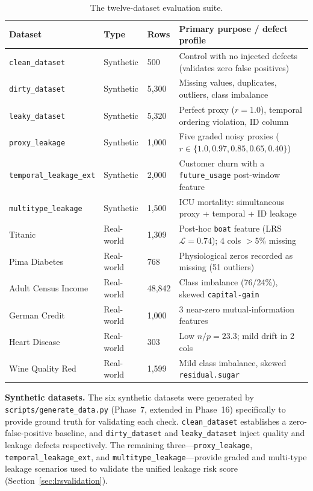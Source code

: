 \documentclass[12pt,a4paper]{report}
\newcommand{\tblhead}{\rowcolor{tblHeadBg}\color{white}\bfseries}
\begin{document}
\begin{table}[!ht]
\centering
\caption{The twelve-dataset evaluation suite.}
\label{tab:datasets}
\scriptsize
{}
\begin{tabularx}{\textwidth}{lllX}
\toprule
\tblhead \textbf{Dataset} & \textbf{Type} & \textbf{Rows} & \textbf{Primary purpose / defect profile} \\
\midrule
\texttt{clean\_dataset} & Synthetic & 500 & Control with no injected defects (validates zero false positives) \\
\texttt{dirty\_dataset} & Synthetic & 5,300 & Missing values, duplicates, outliers, class imbalance \\
\texttt{leaky\_dataset} & Synthetic & 5,320 & Perfect proxy ($r{=}1.0$), temporal ordering violation, ID column \\
\texttt{proxy\_leakage} & Synthetic & 1,000 & Five graded noisy proxies ($r\in\{1.0,0.97,0.85,0.65,0.40\}$) \\
\texttt{temporal\_leakage\_ext} & Synthetic & 2,000 & Customer churn with a \texttt{future\_usage} post-window feature \\
\texttt{multitype\_leakage} & Synthetic & 1,500 & ICU mortality: simultaneous proxy + temporal + ID leakage \\
\midrule
Titanic & Real-world & 1,309 & Post-hoc \texttt{boat} feature (LRS $\mathcal{L}{=}0.74$); 4 cols $>$5\% missing \\
Pima Diabetes & Real-world & 768 & Physiological zeros recorded as missing (51 outliers) \\
Adult Census Income & Real-world & 48,842 & Class imbalance (76/24\%), skewed \texttt{capital-gain} \\
German Credit & Real-world & 1,000 & 3 near-zero mutual-information features \\
Heart Disease & Real-world & 303 & Low $n/p{=}23.3$; mild drift in 2 cols \\
Wine Quality Red & Real-world & 1,599 & Mild class imbalance, skewed \texttt{residual.sugar} \\
\bottomrule
\end{tabularx}
\end{table}

\textbf{Synthetic datasets.} The six synthetic datasets were generated by
\texttt{scripts/generate\_data.py} (Phase~7, extended in Phase~16) specifically to provide
ground truth for validating each check.  \texttt{clean\_dataset} establishes a
zero-false-positive baseline, and \texttt{dirty\_dataset} and \texttt{leaky\_dataset} inject
quality and leakage defects respectively.  The remaining three---\texttt{proxy\_leakage},
\texttt{temporal\_leakage\_ext}, and \texttt{multitype\_leakage}---provide graded and
multi-type leakage scenarios used to validate the unified leakage risk score
(Section~\ref{sec:lrsvalidation}).
\end{document}
